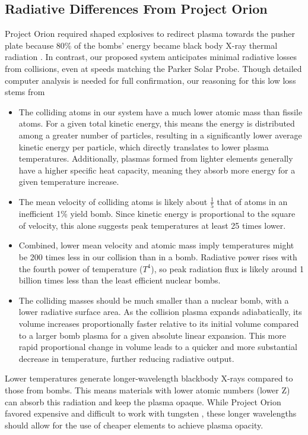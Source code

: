 \documentclass{article}
\begin{document}
{\subsection{Radiative Differences From Project Orion}\label{sec:radiative_differences}
Project Orion required shaped explosives to redirect plasma towards the pusher plate because 80\% of the bombs' energy became black body X-ray thermal radiation \cite{toughsf_cassaba_howitzer}.  In contrast, our proposed system anticipates minimal radiative losses from collisions, even at speeds matching the Parker Solar Probe. Though detailed computer analysis is needed for full confirmation, our reasoning for this low loss stems from
\begin{itemize}
    \item The colliding atoms in our system have a much lower atomic mass than fissile atoms. For a given total kinetic energy, this means the energy is distributed among a greater number of particles, resulting in a significantly lower average kinetic energy per particle, which directly translates to lower plasma temperatures. Additionally, plasmas formed from lighter elements generally have a higher specific heat capacity, meaning they absorb more energy for a given temperature increase. 
    \item The mean velocity of colliding atoms is likely about $\frac{1}{5}$ that of atoms in an inefficient 1\% yield bomb.  Since kinetic energy is proportional to the square of velocity, this alone suggests peak temperatures at least 25 times lower.
    \item Combined, lower mean velocity and atomic mass imply temperatures might be 200 times less in our collision than in a bomb.  Radiative power rises with the fourth power of temperature ($T^4$), so peak radiation flux is likely around 1 billion times less than the least efficient nuclear bombs.
    \item The colliding masses should be much smaller than a nuclear bomb, with a lower radiative surface area.   As the collision plasma expands adiabatically, its volume increases proportionally faster relative to its initial volume compared to a larger bomb plasma for a given absolute linear expansion. This more rapid proportional change in volume leads to a quicker and more substantial decrease in temperature, further reducing radiative output.
\end{itemize}

Lower temperatures generate longer-wavelength blackbody X-rays compared to those from bombs. This means materials with lower atomic numbers (lower Z) can absorb this radiation and keep the plasma opaque. While Project Orion favored expensive and difficult to work with tungsten \cite{toughsf_cassaba_howitzer}, these longer wavelengths should allow for the use of cheaper elements to achieve plasma opacity.

}
\end{document}
